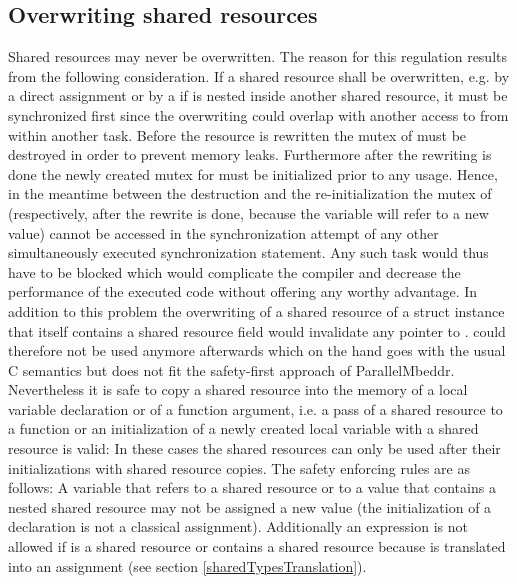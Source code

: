 \subsection{Overwriting shared resources}
\label{overwritingSharedResources}
Shared resources may never be overwritten. The reason for this regulation results from the following consideration. If a shared resource  shall be overwritten, e.g. by a direct assignment or by a  if  is nested inside another shared resource, it must be synchronized first since the overwriting could overlap with another access to  from within another task. Before the resource is rewritten the mutex of  must be destroyed in order to prevent memory leaks. Furthermore after the rewriting is done the newly created mutex for  must be initialized prior to any usage. Hence, in the meantime between the destruction and the re-initialization the mutex of  (respectively,  after the rewrite is done, because the variable will refer to a new value) cannot be accessed in the synchronization attempt of any other simultaneously executed synchronization statement. Any such task would thus have to be blocked which would complicate the compiler and decrease the performance of the executed code without offering any worthy advantage. In addition to this problem the overwriting of a shared resource of a struct instance that itself contains a shared resource field  would invalidate any pointer  to .  could therefore not be used anymore afterwards which on the hand goes with the usual C semantics but does not fit the safety-first approach of ParallelMbeddr.
Nevertheless it is safe to copy a shared resource into the memory of a local variable declaration or of a function argument, i.e. a pass of a shared resource to a function or an initialization of a newly created local variable with a shared resource is valid: In these cases the shared resources can only be used after their initializations with shared resource copies.
The safety enforcing rules are as follows: A variable that refers to a shared resource or to a value that contains a nested shared resource may not be assigned a new value (the initialization of a declaration is not a classical assignment). Additionally an expression  is not allowed if  is a shared resource or contains a shared resource because  is translated into an assignment (see section \ref{sharedTypesTranslation}).